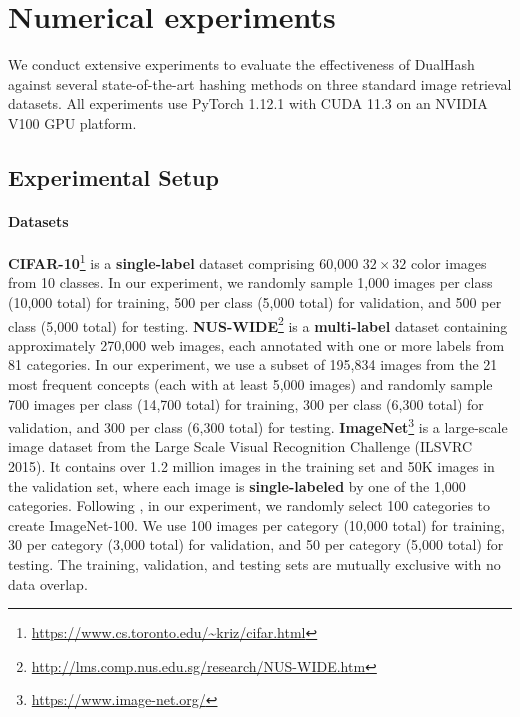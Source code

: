 \section{Numerical experiments}
\label{Section: Numerical experiments}
We conduct extensive experiments to evaluate the effectiveness of DualHash against several state-of-the-art hashing methods on three
standard image retrieval datasets. All experiments use PyTorch 1.12.1 with CUDA 11.3 on an NVIDIA V100 GPU platform.
\subsection{Experimental Setup}
\paragraph{Datasets} \textbf{CIFAR-10}\footnote{\url{https://www.cs.toronto.edu/~kriz/cifar.html}} is a \textbf{single-label} dataset comprising 60,000 $32 \times 32$ color images from 10 classes. 
In our experiment, we randomly sample 1,000 images per class (10,000 total) for training, 500 per class (5,000 total) for validation, and 500 per class (5,000 total) for testing.
\textbf{NUS-WIDE}\footnote{\url{http://lms.comp.nus.edu.sg/research/NUS-WIDE.htm}} is a \textbf{multi-label} dataset containing approximately 270,000 web images, each annotated with one or more labels from 81 categories. 
In our experiment, we use a subset of 195,834 images from the 21 most frequent concepts (each with at least 5,000 images) and randomly sample 700 images per class (14,700 total) for training, 300 per class (6,300 total) for validation, and 300 per class (6,300 total) for testing.
\textbf{ImageNet}\footnote{\url{https://www.image-net.org/}} is a large-scale image dataset from the Large Scale Visual Recognition Challenge (ILSVRC 2015). It contains over 1.2 million images in the training set and 50K images in the validation set, where each image is \textbf{single-labeled} by one of the 1,000 categories. Following \cite{Cao2017HashNetDL}, in our experiment, we randomly select 100 categories to create ImageNet-100. We use 100 images per category (10,000 total) for training, 30 per category (3,000 total) for validation, and 50 per category (5,000 total) for testing. The training, validation, and testing sets are mutually exclusive with no data overlap.

